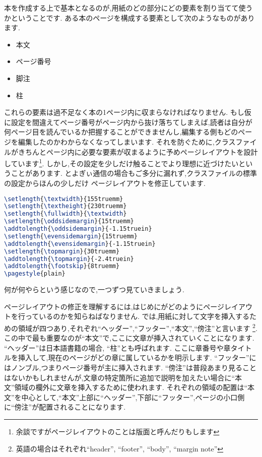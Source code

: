 本を作成する上で基本となるのが,用紙のどの部分にどの要素を割り当てて使うかということです.
ある本のページを構成する要素として次のようなものがあります.
\begin{itemize}
	\item 本文
	\item ページ番号
	\item 脚注
	\item 柱
\end{itemize}
これらの要素は過不足なく本の1ページ内に収まらなければなりません.
もし仮に設定を間違えてページ番号がページ内から抜け落ちてしまえば,読者は自分が何ページ目を読んでいるか把握することができませんし,編集する側もどのページを編集したのかわからなくなってしまいます.
それを防ぐために,クラスファイルがきちんとページ内に必要な要素が収まるように予めページレイアウトを設計しています\footnote{余談ですがページレイアウトのことは版面と呼んだりもします}.
しかし,その設定を少しだけ触ることでより理想に近づけたいということがあります.
とよぎぃ通信の場合もご多分に漏れず,クラスファイルの標準の設定からほんの少しだけ
ページレイアウトを修正しています.
\begin{lstlisting}[caption = ページレイアウトの修正,label = list:layout,language = tex]
\setlength{\textwidth}{155truemm}
\setlength{\textheight}{230truemm}
\setlength{\fullwidth}{\textwidth}
\setlength{\oddsidemargin}{15truemm}
\addtolength{\oddsidemargin}{-1.15truein}
\setlength{\evensidemargin}{15truemm}
\addtolength{\evensidemargin}{-1.15truein}
\setlength{\topmargin}{30truemm}
\addtolength{\topmargin}{-2.4truein}
\addtolength{\footskip}{8truemm}
\pagestyle{plain}
\end{lstlisting}
何が何やらという感じなので,一つずつ見ていきましょう.

ページレイアウトの修正を理解するには,はじめに{\pLaTeX}がどのようにページレイアウトを行っているのかを知らねばなりません.
{\pLaTeX}では,用紙に対して文字を挿入するための領域が四つあり,それぞれ``ヘッダー'',``フッター'',``本文'',``傍注''と言います
\footnote{英語の場合はそれぞれ``header'', ``footer'', ``body'', ``margin note''}.
この中で最も重要なのが``本文''で,ここに文章が挿入されていくことになります.
``ヘッダー''は日本語書籍の場合, ``柱''とも呼ばれます.
ここに章番号や章タイトルを挿入して,現在のページがどの章に属しているかを明示します.
``フッター''にはノンブル,つまりページ番号が主に挿入されます.
``傍注''は普段あまり見ることはないかもしれませんが,文章の特定箇所に追加で説明を加えたい場合に``本文''領域の欄外に文章を挿入するために使われます.
それぞれの領域の配置は``本文''を中心として,``本文''上部に``ヘッダー'',下部に``フッター'',ページの小口側に``傍注''が配置されることになります.

